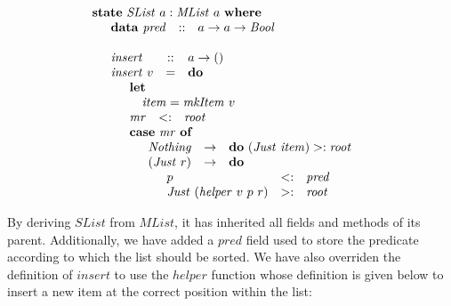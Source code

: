 \documentclass[runningheads,a4paper]{llncs}
\begin{document}
\begin{displaymath}
\begin{array}{l}
\mathbf{state}~\mathit{SList}~a : \mathit{MList}~a~\mathbf{where} \\
\quad \begin{array}{lcl}
\mathbf{data}~\mathit{pred}  & :: & a \to a \to \mathit{Bool}
\end{array}\\\\
\quad \begin{array}{lcl}
\mathit{insert} & :: & a \to ()\\
\mathit{insert}~v & = & \mathbf{do} \\
\multicolumn{3}{l}{\quad \begin{array}{lcl}
\multicolumn{3}{l}{\mathbf{let}}\\
\multicolumn{3}{l}{\quad \mathit{item} = \mathit{mkItem}~v} \\
\mathit{mr} & <: & \mathit{root} \\
\multicolumn{3}{l}{\mathbf{case}~\mathit{mr}~\mathbf{of}} \\
\multicolumn{3}{l}{\quad \begin{array}{lcl}
\mathit{Nothing} & \to & \mathbf{do}~(\mathit{Just}~\mathit{item}) >: \mathit{root} \\
(\mathit{Just}~r) & \to & \mathbf{do} \\
\multicolumn{3}{l}{\quad \begin{array}{lcl}
p & <: & \mathit{pred} \\
\mathit{Just}~(\mathit{helper}~v~p~r) & >: & \mathit{root}
\end{array}}
\end{array}}
\end{array}}
\end{array}
\end{array}
\end{displaymath}

By deriving $\mathit{SList}$ from $\mathit{MList}$, it has inherited all fields and methods of its parent. Additionally, we have added a $\mathit{pred}$ field used to store the predicate according to which the list should be sorted. We have also overriden the definition of $\mathit{insert}$ to use the $\mathit{helper}$ function whose definition is given below to insert a new item at the correct position within the list:
\end{document}
